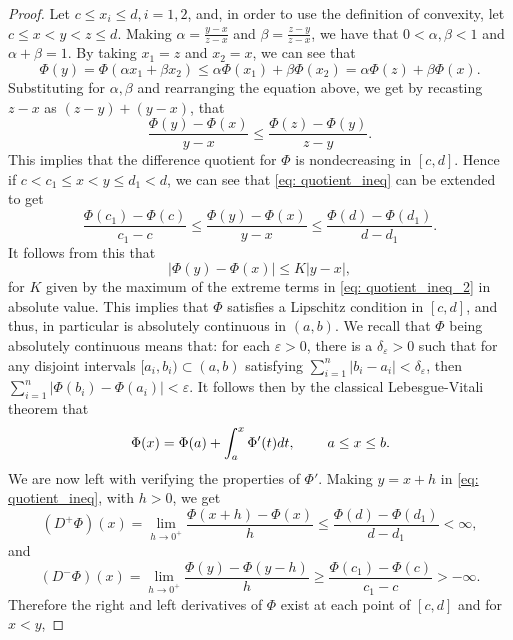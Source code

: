 \documentclass{article}
\theoremstyle{definition}
\begin{document}
\begin{proof}
Let $c \leq x_i \leq d, i = 1,2$, and, in order to use the definition of convexity, let $c\leq x < y < z \leq d$. Making $\alpha = \frac{y-x}{z-x}$ and $\beta =\frac{z- y}{z-x}$, we have that $0 <\alpha,\beta < 1$ and $\alpha + \beta = 1$. By taking $x_1 = z$ and $x_2 = x$, we can see that 
$$\Phi(y) = \Phi(\alpha x_1 + \beta x_2)\leq \alpha\Phi(x_1) + \beta \Phi(x_2) = \alpha \Phi(z) + \beta \Phi(x).$$
Substituting for $\alpha,\beta$ and rearranging the equation above, we get by recasting $z-x$ as $(z-y)+(y-x)$, that 
\begin{equation}\label{eq: quotient_ineq}
\frac{\Phi(y)-\Phi(x)}{y-x}\leq \frac{\Phi(z)-\Phi(y)}{z-y}.
\end{equation}
This implies that the difference quotient for $\Phi$ is nondecreasing in $[c, d]$. Hence if $c < c_1 \leq x < y \leq d_1 < d$, we can see that \eqref{eq: quotient_ineq} can be extended to get
\begin{equation}\label{eq: quotient_ineq_2}
 \frac{\Phi(c_1)-\Phi(c)}{c_1-c}\leq \frac{\Phi(y)-\Phi(x)}{y-x}\leq \frac{\Phi(d)-\Phi(d_1)}{d-d_1}.
\end{equation}
It follows from this that
\begin{equation}
|\Phi(y)-\Phi(x)|\leq K|y-x|,
\end{equation}
for $K$ given by the maximum of the extreme terms in \eqref{eq: quotient_ineq_2} in absolute value. This implies that $\Phi$ satisfies a Lipschitz condition in $[c,d]$, and thus, in particular is absolutely continuous in $(a, b)$. We recall that $\Phi$ being absolutely continuous means that: for each $\varepsilon > 0$, there is a $\delta_{\varepsilon} > 0$ such that for any disjoint intervals $[a_i,b_i)\subset (a,b)$ satisfying $\sum_{i=1}^n|b_i-a_i|<\delta_{\varepsilon}$, then $\sum_{i=1}^n|\Phi(b_i)-\Phi(a_i)|<\varepsilon$. It follows then by the classical Lebesgue-Vitali theorem that
\begin{equation}\label{eq: integral_form}
\Phi(x)=\Phi(a)+\int_a^x\Phi'(t)dt,\hspace{8mm} a\leq x\leq b.
\end{equation}
We are now left with verifying the properties of $\Phi'$. Making $y = x + h$ in \eqref{eq: quotient_ineq}, with $h > 0$, we get
$$(D^+\Phi)(x) = \lim_{h\to 0^+}\frac{\Phi(x+h)-\Phi(x)}{h}\leq \frac{\Phi(d)-\Phi(d_1)}{d-d_1}<\infty,$$
and
$$(D^-\Phi)(x) = \lim_{h\to 0^+}\frac{\Phi(y)-\Phi(y-h)}{h}\geq \frac{\Phi(c_1)-\Phi(c)}{c_1-c} >-\infty.$$
Therefore the right and left derivatives of $\Phi$ exist at each point of $[c, d]$ and for $x < y$,

\end{proof}
\end{document}
